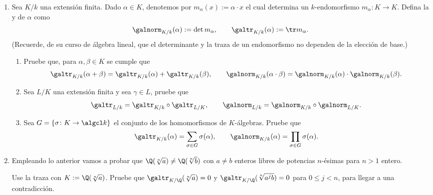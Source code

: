 \documentclass[11pt, reqno]{amsart}
\begin{document}
\begin{enumerate}
	\item Sea $K/k$ una extensión finita.
		Dado $\alpha \in K$, denotemos por $m_\alpha(x) := \alpha\cdot x$ el cual determina un $k$-endomorfismo
		$m_\alpha \colon K \to K$.
		Defina la  y  de $\alpha$ como
		\[
			\galnorm_{K/k}(\alpha) := \det m_\alpha, \qquad \galtr_{K/k}(\alpha) := \tr m_\alpha.
		\]
		(Recuerde, de su curso de álgebra lineal, que el determinante y la traza de un endomorfismo no dependen
		de la elección de base.)
		\begin{enumerate}
			\item Pruebe que, para $\alpha, \beta \in K$ se cumple que
				\[
					\galtr_{K/k}(\alpha + \beta) = \galtr_{K/k}(\alpha) + \galtr_{K/k}(\beta),
					\qquad
					\galnorm_{K/k}(\alpha \cdot \beta) = \galnorm_{K/k}(\alpha) \cdot \galnorm_{K/k}(\beta).
				\]
			\item Sea $L/K$ una extensión finita y sea $\gamma \in L$, pruebe que
				\[
					\galtr_{L/k} = \galtr_{K/k} \circ \galtr_{L/K},
					\qquad
					\galnorm_{L/k} = \galnorm_{K/k} \circ \galnorm_{L/K}.
				\]
			\item Sea $G = \{ \sigma \colon K \to \algcl k \}$ el conjunto de los homomorfismos de
				$K$-álgebras. Pruebe que
				\[
					\galtr_{K/k}(\alpha) = \sum_{\sigma \in G} \sigma(\alpha),
					\qquad
					\galnorm_{K/k}(\alpha) = \prod_{\sigma \in G} \sigma(\alpha).
				\]
		\end{enumerate}

	\item Empleando lo anterior vamos a probar que $\Q(\sqrt[n]{a}) \ne \Q(\sqrt[n]{b})$ con $a \ne b$ enteros
		libres de potencias $n$-ésimas para $n > 1$ entero.

		\begin{hint}
			Use la traza con $K := \Q(\sqrt[n]{a})$.
			Pruebe que $\galtr_{K/\Q}(\sqrt[n]{a}) = 0$ y $\galtr_{K/\Q}(\sqrt[n]{a^j b}) = 0$ para $0 \le j
			< n$, para llegar a una contradicción.
		\end{hint}
\end{enumerate}

\appendix
\end{document}
